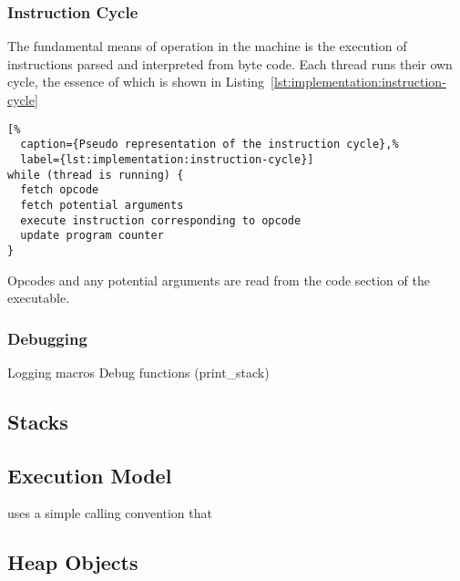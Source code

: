\subsubsection{Instruction Cycle}

The fundamental means of operation in the machine is the execution of
instructions parsed and interpreted from byte code. Each thread runs their own
cycle, the essence of which is shown in
Listing~\ref{lst:implementation:instruction-cycle}

\begin{lstlisting}[%
  caption={Pseudo representation of the instruction cycle},%
  label={lst:implementation:instruction-cycle}]
while (thread is running) {
  fetch opcode
  fetch potential arguments
  execute instruction corresponding to opcode
  update program counter
}
\end{lstlisting}

Opcodes and any potential arguments are read from the code section of the
executable.

\subsubsection{Debugging}
Logging macros
Debug functions (print\_stack)



\subsection{Stacks}
\label{sec:implementation:stacks}


\subsection{Execution Model}
\thename{} uses a simple calling convention that

\subsection{Heap Objects}


